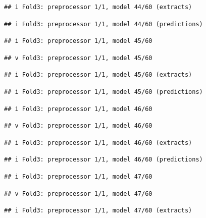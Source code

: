 \documentclass[
]{article}
\begin{document}
\begin{verbatim}
## i Fold3: preprocessor 1/1, model 44/60 (extracts)
\end{verbatim}

\begin{verbatim}
## i Fold3: preprocessor 1/1, model 44/60 (predictions)
\end{verbatim}

\begin{verbatim}
## i Fold3: preprocessor 1/1, model 45/60
\end{verbatim}

\begin{verbatim}
## v Fold3: preprocessor 1/1, model 45/60
\end{verbatim}

\begin{verbatim}
## i Fold3: preprocessor 1/1, model 45/60 (extracts)
\end{verbatim}

\begin{verbatim}
## i Fold3: preprocessor 1/1, model 45/60 (predictions)
\end{verbatim}

\begin{verbatim}
## i Fold3: preprocessor 1/1, model 46/60
\end{verbatim}

\begin{verbatim}
## v Fold3: preprocessor 1/1, model 46/60
\end{verbatim}

\begin{verbatim}
## i Fold3: preprocessor 1/1, model 46/60 (extracts)
\end{verbatim}

\begin{verbatim}
## i Fold3: preprocessor 1/1, model 46/60 (predictions)
\end{verbatim}

\begin{verbatim}
## i Fold3: preprocessor 1/1, model 47/60
\end{verbatim}

\begin{verbatim}
## v Fold3: preprocessor 1/1, model 47/60
\end{verbatim}

\begin{verbatim}
## i Fold3: preprocessor 1/1, model 47/60 (extracts)
\end{verbatim}
\end{document}
